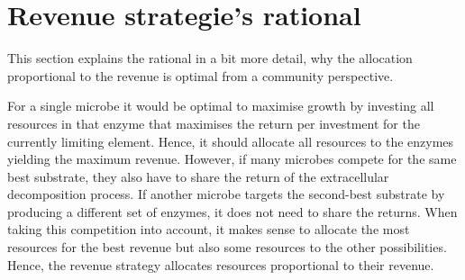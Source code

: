 \section{Revenue strategie's rational \label{app:revenueRational}}    

This section explains the rational in a bit more detail, why
the allocation proportional to the revenue is optimal from a community
perspective.

For a single microbe it would be optimal to maximise growth by investing all
resources in that enzyme that maximises the return per investment for the
currently limiting element. Hence, it should allocate all resources to the
enzymes yielding the maximum revenue.
However, if many microbes compete for the same best substrate, they also have to
share the return of the extracellular decomposition process. If another microbe
targets the second-best substrate by producing a different set of enzymes, it
does not need to share the returns. When taking this competition
into account, it makes sense to allocate the most resources for the best revenue but also some
resources to the other possibilities. Hence, the revenue strategy allocates
resources proportional to their revenue.




